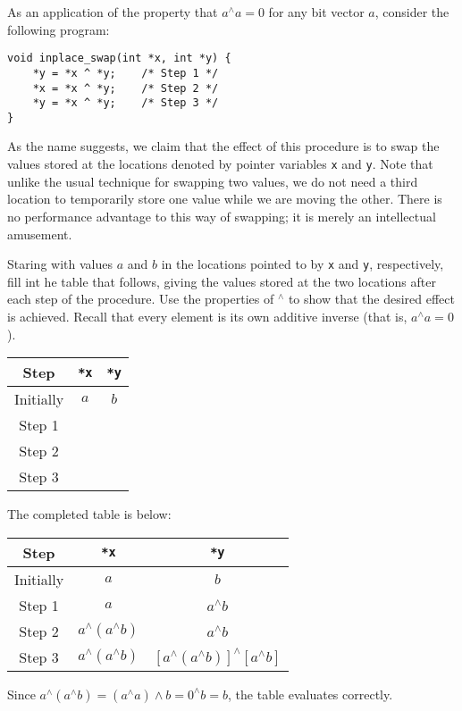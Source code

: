 \documentclass[12pt]{article}
\newenvironment{ex}[2][Exercise]{\begin{trivlist}
		\item[\hskip \labelsep {\bfseries #1}\hskip \labelsep {\bfseries #2.}]}{\end{trivlist}}
\newenvironment{sol}[1][Solution]{\begin{trivlist}
		\item[\hskip \labelsep {\bfseries #1:}]}{\end{trivlist}}
\begin{document}
\begin{ex}{10}
	As an application of the property that $a ^\wedge a=0$ for any bit vector $a$, consider
	the following program:
	\begin{lstlisting}
void inplace_swap(int *x, int *y) {
   	*y = *x ^ *y;    /* Step 1 */
   	*x = *x ^ *y;    /* Step 2 */
   	*y = *x ^ *y;    /* Step 3 */
}
	\end{lstlisting}
	As the name suggests, we claim that the effect of this procedure is to swap the values
	stored at the locations denoted by pointer variables \texttt{x} and \texttt{y}. Note
	that unlike the usual technique for swapping two values, we do not need a third location
	to temporarily store one value while we are moving the other. There is no performance
	advantage to this way of swapping; it is merely an intellectual amusement.
	\
	
	\noindent Staring with values $a$ and $b$ in the locations pointed to by \texttt{x} and
	\texttt{y}, respectively, fill int he table that follows, giving the values stored at the
	two locations after each step of the procedure. Use the properties of $^\wedge$ to
	show that the desired effect is achieved. Recall that every element is its own additive
	inverse (that is, $a^\wedge a=0$).
	\begin{center}
		\begin{tabular}{ccc}
			Step & \texttt{*x} & \texttt{*y}\\
			\hline
			Initially & $a$ & $b$ \\
			Step 1 & \makebox[1cm]{\hrulefill}  & \makebox[1cm]{\hrulefill} \\
			Step 2 & \makebox[1cm]{\hrulefill}  & \makebox[1cm]{\hrulefill} \\
			Step 3 & \makebox[1cm]{\hrulefill}  & \makebox[1cm]{\hrulefill}
		\end{tabular}
	\end{center}
\end{ex}

\begin{sol}
	The completed table is below:
	
	\begin{center}
		\begin{tabular}{ccc}
			Step & \texttt{*x} & \texttt{*y}\\
			\hline
			Initially & $a$ & $b$ \\
			Step 1 & $a$  & $a ^\wedge b$ \\
			Step 2 & $a ^\wedge (a^\wedge b)$ & $a ^\wedge b$ \\
			Step 3 &  $a ^\wedge (a^\wedge b)$  & $[a ^\wedge (a^\wedge b)] ^\wedge [a ^\wedge b]$
		\end{tabular}
	\end{center}
	Since $a ^\wedge (a^\wedge b)=(a^\wedge a)\wedge b=0^\wedge b=b$, the table evaluates
	correctly.
\end{sol}
\end{document}
